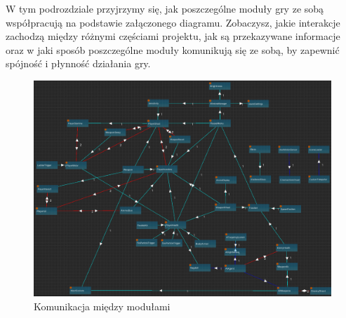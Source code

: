 W tym podrozdziale przyjrzymy się, jak poszczególne moduły gry ze sobą współpracują na podstawie załączonego diagramu. Zobaczysz, jakie interakcje zachodzą między różnymi częściami projektu, jak są przekazywane informacje oraz w jaki sposób poszczególne moduły komunikują się ze sobą, by zapewnić spójność i płynność działania gry.
\begin{figure}[h]
    \centering
    \includegraphics{Images/modulesDependency.png}
    \caption{Komunikacja między modułami}
\end{figure}
\FloatBarrier